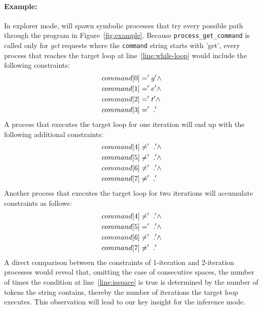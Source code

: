 \paragraph{Example:}
In explorer mode, \lancet will spawn symbolic processes that try every possible path through the program in Figure~\ref{fig:example}.
Because {\tt process\_get\_command} is called only for {\em get} requests where the {\tt command} string starts with 'get\vartextvisiblespace', every process that reaches the target loop at line~\ref{line:while-loop} would include the following constraints:
\begin{align*}
   command[0] &= 'g' \land\\
   command[1] &= 'e' \land\\
   command[2] &= 't' \land\\
   command[3] &= '\vartextvisiblespace'
\end{align*}
A process that executes the target loop for one iteration will end up with the following additional constraints:
\begin{align*}
   command[4] &\neq '\vartextvisiblespace' \land\\
   command[5] &\neq '\vartextvisiblespace' \land\\
   command[6] &\neq '\vartextvisiblespace' \land\\
   command[7] &\neq '\vartextvisiblespace'
\end{align*}
Another process that executes the target loop for two iterations will accumulate constraints as follows:
\begin{align*}
   command[4] &\neq '\vartextvisiblespace' \land\\
   command[5] &= '\vartextvisiblespace' \land\\
   command[6] &\neq '\vartextvisiblespace' \land\\
   command[7] &\neq '\vartextvisiblespace'
\end{align*}
A direct comparison between the constraints of 1-iteration and 2-iteration processes would reveal that, omitting the case of consecutive spaces, the number of times the condition at line~\ref{line:isspace} is true is determined by the number of tokens the string contains, thereby the number of iterations the target loop executes. This observation will lead to our key insight for the inference mode.

